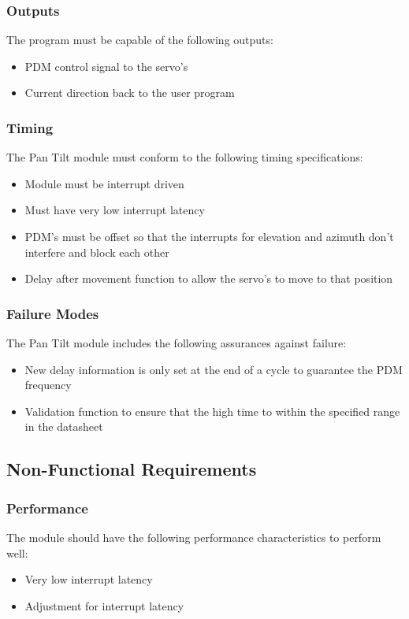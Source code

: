 \documentclass[]{report}
\begin{document}
\subsubsection{Outputs}
The program must be capable of the following outputs:
\begin{itemize}
	\item PDM control signal to the servo's
	\item Current direction back to the user program
\end{itemize}

\subsubsection{Timing}
The Pan Tilt module must conform to the following timing specifications:
\begin{itemize}
	\item Module must be interrupt driven
	\item Must have very low interrupt latency
	\item PDM's must be offset so that the interrupts for elevation and azimuth don't interfere and block each other
	\item Delay after movement function to allow the servo's to move to that position
\end{itemize}

\subsubsection{Failure Modes}
The Pan Tilt module includes the following assurances against failure:
\begin{itemize}
	\item New delay information is only set at the end of a cycle to guarantee the PDM frequency
	\item Validation function to ensure that the high time to within the specified range in the datasheet  
\end{itemize}

\subsection{Non-Functional Requirements}
\subsubsection{Performance}
The module should have the following performance characteristics to perform well:
\begin{itemize}
	\item Very low interrupt latency
	\item Adjustment for interrupt latency
\end{itemize}
\end{document}
